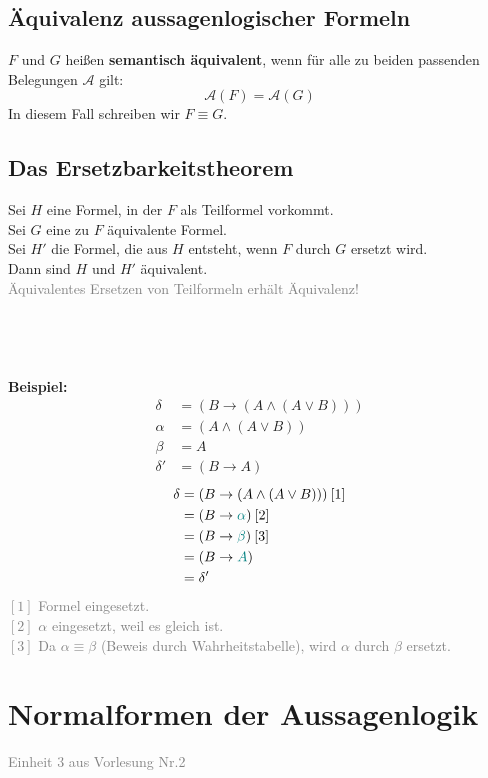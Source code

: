 \documentclass{article}
\begin{document}
	\subsection{Äquivalenz aussagenlogischer Formeln}
	$F$ und $G$ heißen \textbf{semantisch äquivalent}, wenn für alle zu beiden passenden Belegungen $\mathcal{A}$ gilt: 
	\[\mathcal{A}(F) = \mathcal{A}(G)\]
	In diesem Fall schreiben wir $F \equiv G$.
	\subsection{Das Ersetzbarkeitstheorem}
	Sei $H$ eine Formel, in der $F$ als Teilformel vorkommt. \\
	Sei $G$ eine zu $F$ äquivalente Formel. \\
	Sei $H'$ die Formel, die aus $H$ entsteht, wenn $F$ durch $G$ ersetzt wird. \\
	Dann sind $H$ und $H'$ äquivalent. \\
	\textcolor{gray}{Äquivalentes Ersetzen von Teilformeln erhält Äquivalenz!} \\
	\\
	\\
	\\
	\\
	\textbf{Beispiel: }\\
	\begin{align*}
		\delta &= (B \rightarrow (A \wedge (A \vee B))) \\
		\alpha &= (A \wedge (A \vee B)) \\
		\beta &= A \\
		\delta' &= (B \rightarrow A)
	\end{align*}
	\begin{align*}
		\delta &= (B \rightarrow (A \wedge (A \vee B))) \: [1] \\
	    	   &= (B \rightarrow \textcolor{teal}{\alpha}) \: [2]  \\
	    	   &= (B \rightarrow \textcolor{teal}{\beta}) \: [3] \\
	    	   &= (B \rightarrow \textcolor{teal}{A})\\
	    	   &= \delta'
	\end{align*}
	\textcolor{gray}{
		$[1]$ Formel eingesetzt.\\
		$[2]$ $\alpha$ eingesetzt, weil es gleich ist.\\
		$[3]$ Da $\alpha \equiv \beta$ (Beweis durch Wahrheitstabelle), wird $\alpha$ durch $\beta$ ersetzt.\\
	}
	\section{Normalformen der Aussagenlogik}
	\textcolor{gray}{Einheit 3 aus Vorlesung Nr.2}
\end{document}
